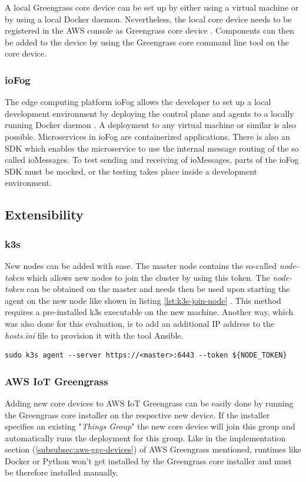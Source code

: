\bigskip
A local Greengrass core device can be set up by either using a virtual machine or by using a local Docker daemon. Nevertheless, the local core device needs to be registered in the \gls{AWS} console as Greengrass core device \cite{AWSGGCInDocker}. Components can then be added to the device by using the Greengrass core command line tool on the core device.

\subsubsection*{ioFog}
The edge computing platform ioFog allows the developer to set up a local development environment by deploying the control plane and agents to a locally running Docker daemon \cite{ioFogLocalDeployment}. A deployment to any virtual machine or similar is also possible. Microservices in ioFog are containerized applications. There is also an SDK which enables the microservice to use the internal message routing of the so called ioMessages. To test sending and receiving of ioMessages, parts of the ioFog SDK must be mocked, or the testing takes place inside a development environment. 

\subsection*{Extensibility}
\subsubsection*{k3s} New nodes can be added with ease. The master node contains the so-called \textit{node-token} which allows new nodes to join the cluster by using this token. The \textit{node-token} can be obtained on the master and needs then be used upon starting the agent on the new node like shown in listing \ref{lst:k3s-join-node} \cite{k3s}. This method requires a pre-installed k3s executable on the new machine. Another way, which was also done for this evaluation, is to add an additional IP address to the \textit{hosts.ini} file to provision it with the tool Ansible.

\begin{lstlisting}[caption={Joining new node to k3s cluster.},label={lst:k3s-join-node},captionpos=b]
    sudo k3s agent --server https://<master>:6443 --token ${NODE_TOKEN}
\end{lstlisting}

\subsubsection*{AWS IoT Greengrass}
Adding new core devices to AWS IoT Greengrass can be easily done by running the Greengrass core installer on the respective new device. If the installer specifies an existing "\textit{Things Group}" the new core device will join this group and automatically runs the deployment for this group. Like in the implementation section (\ref{subsubsec:aws-ggc-devices}) of \gls{AWS} Greengrass mentioned, runtimes like Docker or Python won't get installed by the Greengrass core installer and must be therefore installed manually.

